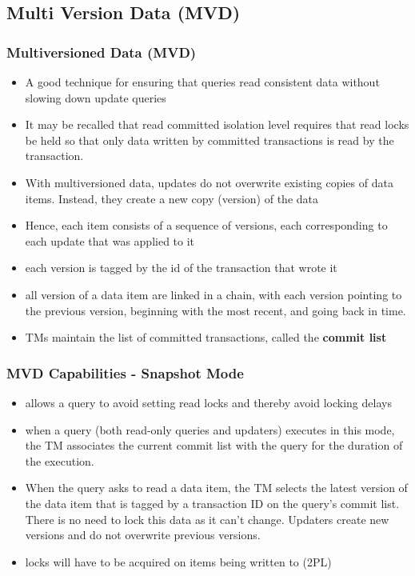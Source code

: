 \documentclass[12]{beamer}
\begin{document}
\subsection{Multi Version Data (MVD)}

\begin{frame}
\frametitle{Multiversioned Data (MVD)}
\begin{itemize} 
\item A good technique for ensuring that queries read consistent data without slowing down update queries
\item It may be recalled that read committed isolation level requires that read locks be held so that only data written by committed transactions is read by the transaction.
\item With multiversioned data, updates do not overwrite existing copies of data items. Instead, they create a new copy (version) of the data
\item Hence, each item consists of a sequence of versions, each corresponding to each update that was applied to it
\item each version is tagged by the id of the transaction that wrote it
\item all version of a data item are linked in a chain, with each version pointing to the previous version, beginning with the most recent, and going back in time.
\item TMs maintain the list of committed transactions, called the \textbf{commit list}
\end{itemize}
\end{frame}

\begin{frame}
\frametitle{MVD Capabilities - Snapshot Mode}
\begin{itemize}
\item allows a query to avoid setting read locks and thereby avoid locking delays
\item when a query (both read-only queries and updaters) executes in this mode, the TM associates the current commit list with the query for the duration of the execution.
\item When the query asks to read a data item, the TM selects the latest version of the data item that is tagged by a transaction ID on the query's commit list. There is no need to lock this data as it can't change. Updaters create new versions and do not overwrite previous versions.
\item locks will have to be acquired on items being written to (2PL)
\end{itemize}
\end{frame}
\end{document}
